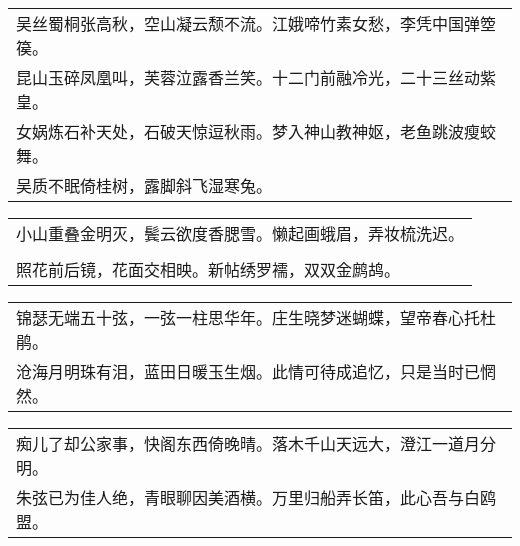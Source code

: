 \noindent\begin{minipage}{\linewidth}
  \vskip-3pt\begin{table}[H]
    \centering
    \begin{tabular}{@{}l@{}}
吴丝蜀桐张高秋，空山凝云颓不流。江娥啼竹素女愁，李凭中国弹箜篌。\\
昆山玉碎凤凰叫，芙蓉泣露香兰笑。十二门前融冷光，二十三丝动紫皇。\\
女娲炼石补天处，石破天惊逗秋雨。梦入神山教神妪，老鱼跳波瘦蛟舞。\\
吴质不眠倚桂树，露脚斜飞湿寒兔。
    \end{tabular}
  \end{table}
\end{minipage}
\vspace{1cm}


\noindent\begin{minipage}{\linewidth}
  \vskip-3pt\begin{table}[H]
    \centering
    \begin{tabular}{@{}l@{}}
小山重叠金明灭，鬓云欲度香腮雪。懒起画蛾眉，弄妆梳洗迟。\\
\\
照花前后镜，花面交相映。新帖绣罗襦，双双金鹧鸪。
    \end{tabular}
  \end{table}
\end{minipage}
\vspace{1cm}


\noindent\begin{minipage}{\linewidth}
  \vskip-3pt\begin{table}[H]
    \centering
    \begin{tabular}{@{}l@{}}
锦瑟无端五十弦，一弦一柱思华年。庄生晓梦迷蝴蝶，望帝春心托杜鹃。\\
沧海月明珠有泪，蓝田日暖玉生烟。此情可待成追忆，只是当时已惘然。
    \end{tabular}
  \end{table}
\end{minipage}
\vspace{1cm}


\noindent\begin{minipage}{\linewidth}
  \vskip-3pt\begin{table}[H]
    \centering
    \begin{tabular}{@{}l@{}}
痴儿了却公家事，快阁东西倚晚晴。落木千山天远大，澄江一道月分明。\\
朱弦已为佳人绝，青眼聊因美酒横。万里归船弄长笛，此心吾与白鸥盟。
    \end{tabular}
  \end{table}
\end{minipage}
\vspace{1cm}


